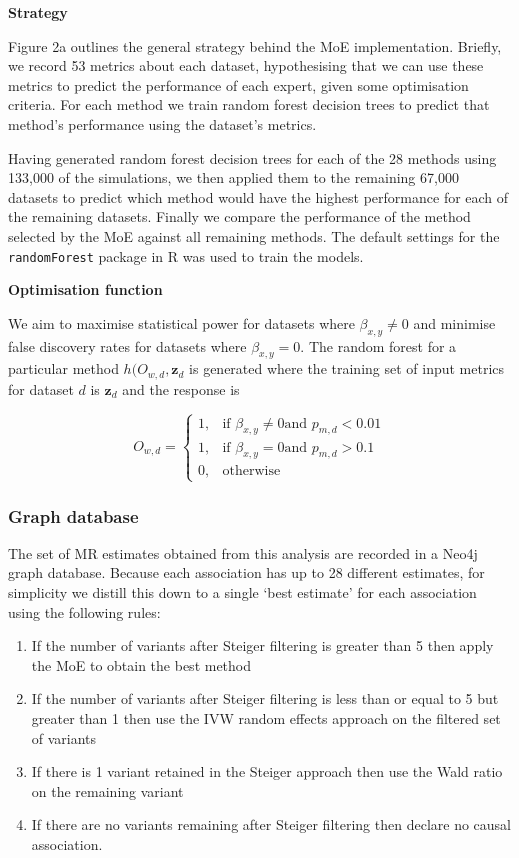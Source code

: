 \documentclass[]{article}
\providecommand{\tightlist}{%
  \setlength{\itemsep}{0pt}\setlength{\parskip}{0pt}}
\begin{document}
\textbf{Strategy}

Figure 2a outlines the general strategy behind the MoE implementation.
Briefly, we record 53 metrics about each dataset, hypothesising that we
can use these metrics to predict the performance of each expert, given
some optimisation criteria. For each method we train random forest
decision trees to predict that method's performance using the dataset's
metrics.

Having generated random forest decision trees for each of the 28 methods
using 133,000 of the simulations, we then applied them to the remaining
67,000 datasets to predict which method would have the highest
performance for each of the remaining datasets. Finally we compare the
performance of the method selected by the MoE against all remaining
methods. The default settings for the \texttt{randomForest} package in R
was used to train the models.

\textbf{Optimisation function}

We aim to maximise statistical power for datasets where
\(\beta_{x,y} \neq 0\) and minimise false discovery rates for datasets
where \(\beta_{x,y} = 0\). The random forest for a particular method
\(h(O_{w,d}, \textbf{z}_{d}\) is generated where the training set of
input metrics for dataset \(d\) is \(\textbf{z}_{d}\) and the response
is

\[
    O_{w,d} = 
\begin{cases}
    1,   & \text{if } \beta_{x,y} \neq 0 \text{and } p_{m,d} < 0.01\\
    1,   & \text{if } \beta_{x,y} = 0 \text{and } p_{m,d} > 0.1 \\
    0,   & \text{otherwise}
\end{cases}
\]

\subsubsection{Graph database}\label{graph-database}

The set of MR estimates obtained from this analysis are recorded in a
Neo4j graph database. Because each association has up to 28 different
estimates, for simplicity we distill this down to a single `best
estimate' for each association using the following rules:

\begin{enumerate}
\def\labelenumi{\arabic{enumi}.}
\tightlist
\item
  If the number of variants after Steiger filtering is greater than 5
  then apply the MoE to obtain the best method
\item
  If the number of variants after Steiger filtering is less than or
  equal to 5 but greater than 1 then use the IVW random effects approach
  on the filtered set of variants
\item
  If there is 1 variant retained in the Steiger approach then use the
  Wald ratio on the remaining variant
\item
  If there are no variants remaining after Steiger filtering then
  declare no causal association.
\end{enumerate}
\end{document}
